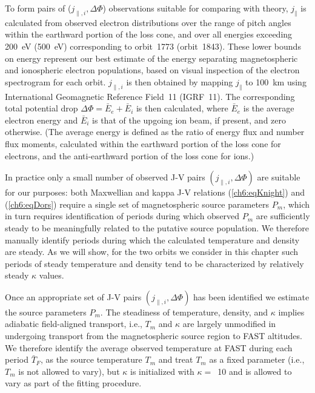   To form pairs of ($j_{\parallel,i}, \Delta \Phi$) observations suitable for
  comparing with theory, $j_\parallel$ is calculated from observed electron
  distributions over the range of pitch angles within the earthward portion of
  the loss cone, and over all energies exceeding 200~eV (500~eV) corresponding
  to orbit~1773 (orbit~1843). These lower bounds on energy represent our best
  estimate of the energy separating magnetospheric and ionospheric electron
  populations, based on visual inspection of the electron spectrogram for each
  orbit. $j_{\parallel,i}$ is then obtained by mapping $j_\parallel$ to 100~km
  using International Geomagnetic Reference Field~11 (IGRF~11). The
  corresponding total potential drop $\Delta \Phi = \bar{E}_e + \bar{E}_i$ is
  then calculated, where $\bar{E}_e$ is the average electron energy and
  $\bar{E}_i$ is that of the upgoing ion beam, if present, and zero
  otherwise. (The average energy is defined as the ratio of energy flux and
  number flux moments, calculated within the earthward portion of the loss cone
  for electrons, and the anti-earthward portion of the loss cone for ions.)

  In practice only a small number of observed J-V pairs
  $( j_{\parallel,i} , \Delta \Phi )$ are suitable for our purposes: both
  Maxwellian and kappa J-V relations (\ref{ch6:eqKnight}) and (\ref{ch6:eqDors})
  require a single set of magnetospheric source parameters $P_m$, which in turn
  requires identification of periods during which observed $P_m$ are
  sufficiently steady to be meaningfully related to the putative source
  population. We therefore manually identify periods during which the calculated
  temperature and density are steady. As we will show, for the two orbits we
  consider in this chapter such periods of steady temperature and density tend
  to be characterized by relatively steady $\kappa$ values.

  Once an appropriate set of J-V pairs $( j_{\parallel,i} , \Delta \Phi )$ has
  been identified we estimate the source parameters $P_m$. The steadiness of
  temperature, density, and $\kappa$ implies adiabatic field-aligned transport,
  i.e., $T_m$ and $\kappa$ are largely unmodified in undergoing transport from
  the magnetospheric source region to FAST altitudes. We therefore identify the
  average observed temperature at FAST during each period $\bar{T}_F$, as the
  source temperature $T_m$ and treat $T_m$ as a fixed parameter (i.e., $T_m$ is
  not allowed to vary), but $\kappa$ is initialized with $\kappa =$~10 and is
  allowed to vary as part of the fitting procedure.

